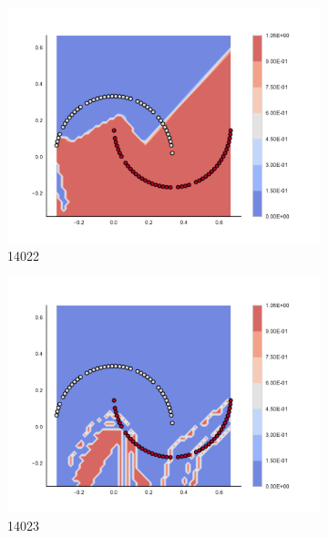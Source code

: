 \begin{figure}[h]
\begin{subfigure}[b]{0.09\textwidth}
    \includegraphics[clip, trim=2.35cm 1.75cm 4.5cm 0cm,width=\textwidth]{img/convergence/14022.pdf}
    \caption{14022}
    \label{fig:convergence_14022}
\end{subfigure}
%
\begin{subfigure}[b]{0.09\textwidth}
    \includegraphics[clip, trim=2.35cm 1.75cm 4.5cm 0cm,width=\textwidth]{img/convergence/14023.pdf}
    \caption{14023}
    \label{fig:convergence_14023}
\end{subfigure}
%
\begin{subfigure}[b]{0.09\textwidth}

\end{subfigure}
\end{figure}
